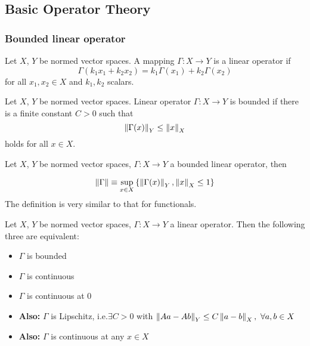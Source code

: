 \newpage



\subsection{Basic Operator Theory}
\subsubsection{Bounded linear operator}
\begin{definition}\rm\nextline
	Let $X$, $Y$ be normed vector spaces. A mapping $\Gamma:X\xrightarrow{}Y$ is a linear operator if
	$$
		\Gamma(k_1x_1+k_2x_2)=k_1\Gamma(x_1)+k_2\Gamma(x_2)
	$$
	for all $x_1,x_2\in X$ and $k_1,k_2$ scalars.
\end{definition}

\begin{definition}\label{continuity of LO}\rm\nextline
	Let $X$, $Y$ be normed vector spaces. Linear operator $\Gamma:X\xrightarrow{}Y$ is bounded if there is a finite constant $C>0$ such that
	$$
		\left\|{\Gamma(x)}\right\|_Y\leq\left\|{x}\right\|_X
	$$
	holds for all $x\in X$.
\end{definition}

\begin{definition}\label{operator norm}\rm\nextline
	Let $X$, $Y$ be normed vector spaces, $\Gamma:X\xrightarrow{}Y$ a bounded linear operator, then

	$$
		\left\|{\Gamma}\right\|\equiv\sup_{x\in X}{\left\{\left\|{\Gamma(x)}\right\|_Y,\left\|{x}\right\|_X\leq1\right\}}
	$$
	The definition is very similar to that for functionals.
\end{definition}

\begin{proposition}\rm\nextline
	Let $X$, $Y$ be normed vector spaces, $\Gamma:X\xrightarrow{}Y$ a linear operator. Then the following three are equivalent:
	\begin{itemize}
		\item $\Gamma$ is bounded
		\item $\Gamma$ is continuous
		\item $\Gamma$ is continuous at 0
		\item {\bf Also:} $\Gamma$ is Lipschitz, i.e.$\exists C>0$ with $\left\|{Aa-Ab}\right\|_Y\leq C\left\|{a-b}\right\|_X,\,\,\forall a,b\in X$
		\item {\bf Also:} $\Gamma$ is continuous at any $x\in X$

	\end{itemize}
\end{proposition}

